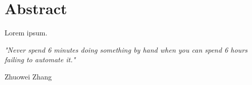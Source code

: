 \hypertarget{abstract}{%
	\section*{Abstract}\label{abstract}}

Lorem ipsum.

\newpage

\emph{"Never spend 6 minutes doing something by hand when you can spend 6 hours failing to automate it."}

Zhuowei Zhang